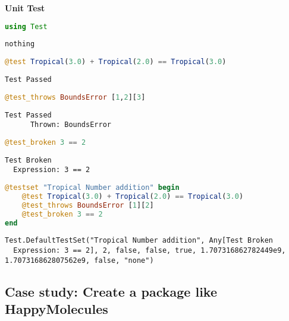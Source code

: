 \documentclass[
  notoc %
]{tufte-book}
\begin{document}
\textbf{Unit Test}

\begin{lstlisting}[language=Julia]
using Test
\end{lstlisting}

\begin{lstlisting}[language=Output]
nothing
\end{lstlisting}

\begin{lstlisting}[language=Julia]
@test Tropical(3.0) + Tropical(2.0) == Tropical(3.0)
\end{lstlisting}

\begin{lstlisting}[language=Output]
Test Passed
\end{lstlisting}

\begin{lstlisting}[language=Julia]
@test_throws BoundsError [1,2][3]
\end{lstlisting}

\begin{lstlisting}[language=Output]
Test Passed
      Thrown: BoundsError
\end{lstlisting}

\begin{lstlisting}[language=Julia]
@test_broken 3 == 2
\end{lstlisting}

\begin{lstlisting}[language=Output]
Test Broken
  Expression: 3 == 2
\end{lstlisting}

\begin{lstlisting}[language=Julia]
@testset "Tropical Number addition" begin
    @test Tropical(3.0) + Tropical(2.0) == Tropical(3.0)
    @test_throws BoundsError [1][2]
    @test_broken 3 == 2
end
\end{lstlisting}

\begin{lstlisting}[language=Output]
Test.DefaultTestSet("Tropical Number addition", Any[Test Broken
  Expression: 3 == 2], 2, false, false, true, 1.707316862782449e9, 1.707316862807562e9, false, "none")
\end{lstlisting}

\hypertarget{case-study-create-a-package-like-happymolecules}{%
\subsection{Case study: Create a package like
HappyMolecules}\label{case-study-create-a-package-like-happymolecules}}
\end{document}

